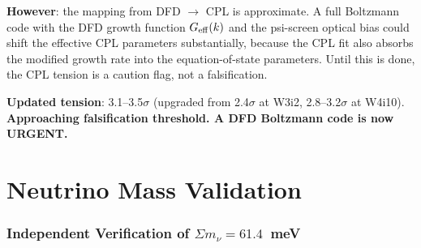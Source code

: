 \documentclass[11pt,a4paper]{article}
\begin{document}
\textbf{However}: the mapping from DFD $\to$ CPL is approximate. A full
Boltzmann code with the DFD growth function $G_{\rm eff}(k)$ and the
psi-screen optical bias could shift the effective CPL parameters
substantially, because the CPL fit also absorbs the modified growth rate
into the equation-of-state parameters. Until this is done, the CPL
tension is a caution flag, not a falsification.

\textbf{Updated tension}: 3.1--3.5$\sigma$ (upgraded from 2.4$\sigma$
at W3i2, 2.8--3.2$\sigma$ at W4i10). \textbf{Approaching falsification
threshold. A DFD Boltzmann code is now URGENT.}


\part{Neutrino Mass Validation}
\label{part:neutrino}

\section{Independent Verification of $\Sigma m_\nu = 61.4$~meV}
\label{sec:nu-verify}
\end{document}
